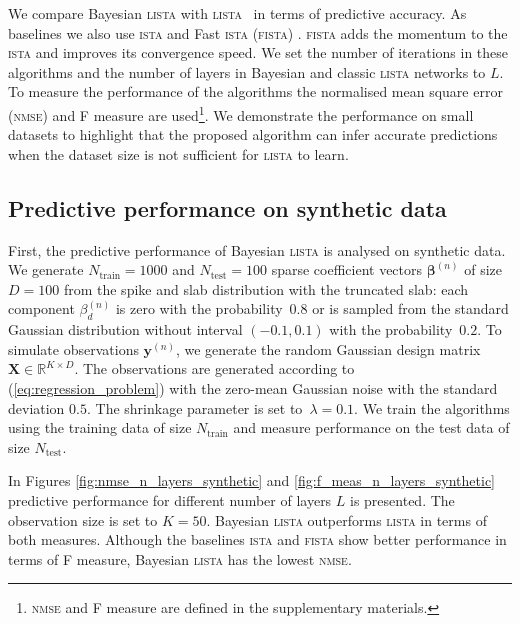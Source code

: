 \documentclass{article}
\begin{document}
We compare Bayesian \textsc{lista} with \textsc{lista}~\cite{gregor2010learning} in terms of predictive accuracy. As baselines we also use \textsc{ista} \cite{daubechies2004iterative} and Fast \textsc{ista} (\textsc{fista}) \cite{beck2009fast}. \textsc{fista} adds the momentum to the \textsc{ista} and improves its convergence speed. We set the number of iterations in these algorithms and the number of layers in Bayesian and classic \textsc{lista} networks to $L$. To measure the performance of the algorithms the normalised mean square error (\textsc{nmse}) and F measure are used\footnote{\textsc{nmse} and F measure are defined in the supplementary materials.}. We demonstrate the performance on small datasets to highlight that the proposed algorithm can infer accurate predictions when the dataset size is not sufficient for \textsc{lista} to learn.

\subsection{Predictive performance on synthetic data}
First, the predictive performance of Bayesian \textsc{lista} is analysed on synthetic data. We generate $N_\text{train}=1000$ and $N_{\text{test}} = 100$ sparse coefficient vectors $\boldsymbol\beta^{(n)}$ of size $D = 100$  from the spike and slab distribution with the truncated slab: each component $\beta^{(n)}_{d}$ is zero with the probability~$0.8$ or is sampled from the standard Gaussian distribution without interval $(-0.1, 0.1)$ with the probability~$0.2$. To simulate observations $\mathbf{y}^{(n)}$, we generate the random Gaussian design matrix $\mathbf{X} \in \mathbb{R}^{K \times D}$.  The observations are generated according to (\ref{eq:regression_problem}) with the zero-mean Gaussian noise with the standard deviation $0.5$. The shrinkage parameter is set to~$\lambda = 0.1$. We train the algorithms using the training data of size $N_\text{train}$ and measure performance on the test data of size $N_{\text{test}}$.

In Figures \ref{fig:nmse_n_layers_synthetic} and \ref{fig:f_meas_n_layers_synthetic} predictive performance for different number of layers $L$ is presented. The observation size is set to $K=50$. Bayesian \textsc{lista} outperforms \textsc{lista} in terms of both measures. Although the baselines \textsc{ista} and \textsc{fista} show better performance in terms of F measure, Bayesian \textsc{lista} has the lowest \textsc{nmse}.
\end{document}
